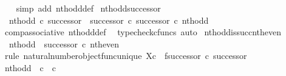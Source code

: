 \begin{isabellebody}
%
\isadelimproof
\ \ %
\endisadelimproof
%
\isatagproof
{}\isamarkupfalse%
\ {\isacharparenleft}{\kern0pt}simp\ add{\isacharcolon}{\kern0pt}\ nth{\isacharunderscore}{\kern0pt}odd{\isacharunderscore}{\kern0pt}def{}{\isacharparenright}{\kern0pt}%
\endisatagproof
{\isafoldproof}%
%
\isadelimproof
\isanewline
%
\endisadelimproof
\isanewline
{}\isamarkupfalse%
\ nth{\isacharunderscore}{\kern0pt}odd{\isacharunderscore}{\kern0pt}successor{}{\isacharcolon}{\kern0pt}\isanewline
\ \ {\isachardoublequoteopen}nth{\isacharunderscore}{\kern0pt}odd\ {\isasymcirc}\isactrlsub c\ successor\ {\isacharequal}{\kern0pt}\ successor\ {\isasymcirc}\isactrlsub c\ successor\ {\isasymcirc}\isactrlsub c\ nth{\isacharunderscore}{\kern0pt}odd{\isachardoublequoteclose}\isanewline
%
\isadelimproof
\ \ %
\endisadelimproof
%
\isatagproof
{}\isamarkupfalse%
\ comp{\isacharunderscore}{\kern0pt}associative{}\ nth{\isacharunderscore}{\kern0pt}odd{\isacharunderscore}{\kern0pt}def{}\ \isamarkupfalse%
\ {\isacharparenleft}{\kern0pt}typecheck{\isacharunderscore}{\kern0pt}cfuncs{\isacharcomma}{\kern0pt}\ auto{\isacharparenright}{\kern0pt}%
\endisatagproof
{\isafoldproof}%
%
\isadelimproof
\isanewline
%
\endisadelimproof
\isanewline
{}\isamarkupfalse%
\ nth{\isacharunderscore}{\kern0pt}odd{\isacharunderscore}{\kern0pt}is{\isacharunderscore}{\kern0pt}succ{\isacharunderscore}{\kern0pt}nth{\isacharunderscore}{\kern0pt}even{\isacharcolon}{\kern0pt}\isanewline
\ \ {\isachardoublequoteopen}nth{\isacharunderscore}{\kern0pt}odd\ {\isacharequal}{\kern0pt}\ successor\ {\isasymcirc}\isactrlsub c\ nth{\isacharunderscore}{\kern0pt}even{\isachardoublequoteclose}\isanewline
%
\isadelimproof
%
\endisadelimproof
%
\isatagproof
{}\isamarkupfalse%
\ {\isacharparenleft}{\kern0pt}rule\ natural{\isacharunderscore}{\kern0pt}number{\isacharunderscore}{\kern0pt}object{\isacharunderscore}{\kern0pt}func{\isacharunderscore}{\kern0pt}unique{\isacharbrackleft}{\kern0pt}\ X{\isacharequal}{\kern0pt}{\isachardoublequoteopen}{\isasymnat}\isactrlsub c{\isachardoublequoteclose}{\isacharcomma}{\kern0pt}\ \ f{\isacharequal}{\kern0pt}{\isachardoublequoteopen}successor\ {\isasymcirc}\isactrlsub c\ successor{\isachardoublequoteclose}{\isacharbrackright}{\kern0pt}{\isacharparenright}{\kern0pt}\isanewline
\ \ \isamarkupfalse%
\ {\isachardoublequoteopen}nth{\isacharunderscore}{\kern0pt}odd\ {\isacharcolon}{\kern0pt}\ {\isasymnat}\isactrlsub c\ {\isasymrightarrow}\ {\isasymnat}\isactrlsub c{\isachardoublequoteclose}\isanewline

\end{isabellebody}
